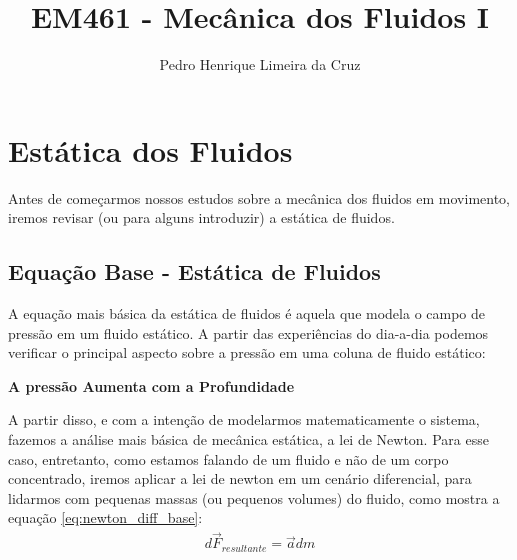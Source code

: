\documentclass{article}
\author{Pedro Henrique Limeira da Cruz}
\title{EM461 - Mecânica dos Fluidos I}
\begin{document}
    \maketitle
    \thispagestyle{empty}


    \newpage
    \tableofcontents
    \newpage

    \section{Estática dos Fluidos}
        Antes de começarmos nossos estudos sobre a mecânica dos fluidos em movimento, iremos revisar (ou para alguns introduzir) a estática de fluidos. 

        \subsection{Equação Base - Estática de Fluidos}
            A equação mais básica da estática de fluidos é aquela que modela o campo de pressão em um fluido estático. A partir das experiências do dia-a-dia podemos verificar o principal aspecto
            sobre a pressão em uma coluna de fluido estático: 

            \begin{center}
                \textbf{A pressão Aumenta com a Profundidade}
            \end{center}

            A partir disso, e com a intenção de modelarmos matematicamente o sistema, fazemos a análise mais básica de mecânica estática, a lei de Newton. Para esse caso, entretanto, como estamos
            falando de um fluido e não de um corpo concentrado, iremos aplicar a lei de newton em um cenário diferencial, para lidarmos com pequenas massas (ou pequenos volumes) do fluido, como mostra a equação \ref{eq:newton_diff_base}:
            \begin{align}
                d\vec{F}_{resultante}= \vec a dm \label{eq:newton_diff_base}
            \end{align}
\end{document}
